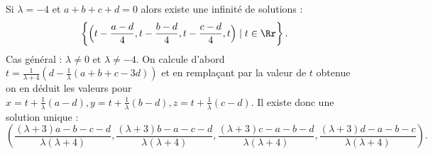 {{Si $\lambda=-4$ et $a+b+c+d=0$ alors existe une infinité de solutions :
$$\left\{\Big(t-\frac{a-d}{4}, t-\frac{b-d}{4}, t-\frac{c-d}{4}, t\Big) \mid t\in\Rr \right\}.$$
Cas général : $\lambda\neq 0$ et $\lambda\neq -4$.
On calcule d'abord $t= \frac{1}{\lambda+4}\left(d - \frac 1\lambda(a+b+c-3d)\right)$ 
et en remplaçant par la valeur de $t$ obtenue on en 
déduit les valeurs pour 
$x=t+\frac1\lambda(a-d),y=t+\frac1\lambda(b-d),z=t+\frac1\lambda(c-d)$. Il existe donc une solution unique :
$$\left(\frac{(\lambda+3)a-b-c-d}{\lambda(\lambda+4)}, \frac{(\lambda+3)b-a-c-d}{\lambda(\lambda+4)}, \frac{(\lambda+3)c-a-b-d}{\lambda(\lambda+4)},\frac{(\lambda+3)d-a-b-c}{\lambda(\lambda+4)}\right).$$
}
}
